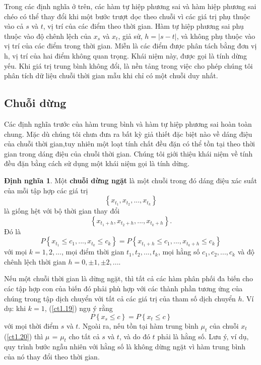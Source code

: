 \documentclass[12pt, a4paper,oneside]{book}
\theoremstyle{definition}
\newtheorem{dn}[theo]{Định nghĩa}
\begin{document}
Trong các định nghĩa ở trên, các hàm tự hiệp phương sai và hàm hiệp phương sai chéo có thể thay đổi khi một bước trượt dọc theo chuỗi vì các giá trị phụ thuộc vào cả $s$ và $t$, vị trí của các điểm theo thời gian. Hàm tự hiệp phương sai phụ thuộc vào độ chênh lệch của $x_{s}$ và $x_{t}$, giả sử, $h= \lvert s-t\lvert$, và không phụ thuộc vào vị trí của các điểm trong thời gian. Miễn là các điểm được phân tách bằng đơn vị h, vị trí của hai điểm không quan trọng. Khái niệm này, được gọi là tính dừng yếu. Khi giá trị trung bình không đổi, là nền tảng trong việc cho phép chúng tôi phân tích dữ liệu chuỗi thời gian mẫu khi chỉ có một chuỗi duy nhất.

\subsection{Chuỗi dừng}

Các định nghĩa trước của hàm trung bình và hàm tự hiệp phương sai hoàn toàn chung. Mặc dù chúng tôi chưa đưa ra bất kỳ giả thiết đặc biệt nào về dáng điệu của chuỗi thời gian,tuy nhiên một loạt tính chất đều đặn có thể tồn tại theo thời gian trong dáng điệu của chuỗi thời gian. Chúng tôi giới thiệu khái niệm về tính đều đặn bằng cách sử dụng một khái niệm gọi là tính dừng. 
\begin{dn}\label{dn1.6}Một \textbf{chuỗi dừng ngặt} là một chuỗi trong đó dáng điệu xác suất của mỗi tập hợp các giá trị
	$$\left\lbrace x_{t_{1}}, x_{t_{2}},..., x_{t_{k}}\right\rbrace$$
là giống hệt với bộ thời gian thay đổi
$$\left\lbrace x_{t_{1}+h}, x_{t_{2}+h},..., x_{t_{k}+h}\right\rbrace.$$
Đó là 
	\begin{equation}
	P\left\lbrace x_{t_{1}}\le c_{1},...,x_{t_{k}}\le c_{k}\right\rbrace = P\left\lbrace x_{t_{1}+h}\le c_{1},...,x_{t_{k}+h}\le c_{k}\right\rbrace \label{ct1.19}
	\end{equation}
với mọi $k=1,2,...$, mọi điểm thời gian $t_{1},t_{2},...,t_{k}$, mọi hằng số $c_{1},c_{2},...,c_{k}$ và độ chênh lệch thời gian $h=0,\pm1,\pm2,...$.
\end{dn}

Nếu một chuỗi thời gian là dừng ngặt, thì tất cả các hàm phân phối đa biến cho các tập hợp con của biến đó phải phù hợp với các thành phần tương ứng của chúng trong tập dịch chuyển với tất cả các giá trị của tham số dịch chuyển $h$. Ví dụ: khi $k = 1$, (\ref{ct1.19}) ngụ ý rằng
\begin{equation}
	P\left\lbrace x_{s} \le  c \right\rbrace = P\left\lbrace x_{t} \le  c \right\rbrace \label{ct1.20}
\end{equation} 
với mọi thời điểm $s$ và $t$. Ngoài ra, nếu tồn tại hàm trung bình $\mu_{t}$ của chuỗi $x_{t}$ (\ref{ct1.20}) thì $\mu_{}$ = $\mu_{t}$ cho tất cả $s$ và $t$, và do đó $t$ phải là hằng số. Lưu ý, ví dụ, quy trình bước ngẫu nhiên với hằng số là không dừng ngặt vì hàm trung bình của nó thay đổi theo thời gian.
\end{document}
